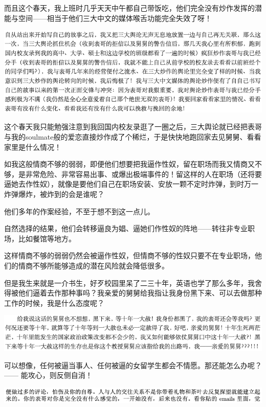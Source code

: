 \documentclass[9pt, b5paper]{article}
\begin{document}
而且这个春天，我上班时几乎天天中午都自己带饭吃，他们完全没有炒作发挥的潜能与空间——相当于他们三大中文的媒体喉舌功能完全失效了呀！

\begin{center}
\includegraphics[width=.9\linewidth]{./pic/backups_plans_20210417_220122.png}
\end{center}

这个春天我只能勉强注意到我回国内校友录逛了一圈之后，三大舆论就已经把表哥与我的soulmate般的爱恋直接炒作成了个稀烂，于是快快地跑回家去见舅舅、看看家里是什么情况！

如我这般情商不够的弱弱，即便他们想要把我逼作性奴，留在职场而我又情商又不够，是非常危险、非常容易出事、或爆出极端事件的！留这样的人在职场（还将要逼她去作性奴），就像是要他们自己在职场安装、安放一颗不定时炸弹，到时万一炸弹爆炸，被炸到的会是谁呢？

他们多年的作案经验，不至于想不到这一点儿。 

自然选择的结果，他们会转移逼良为娼、逼她们作性奴的阵地——转往非专业职场，比如餐馆等地方。 

这样情商不够的弱弱仍然会被逼作性奴，但情商不够的性奴只要不在专业职场，他们的情商不够所能够造成的潜在风险就会降低很多。 

但是我生来就是一介书生，好歹校园里呆了二三十年，英语也学了那么多年，我舍得被他们逼着去作那种事吗？我亲爱的舅舅给我指让我身份黑下来、可以去做那种工作的时候，我是什么态度呢？

\begin{center}
\includegraphics[width=.9\linewidth]{./pic/backups_plans_20210417_221406.png}
\end{center}

可以想像，任何被逼当事人、任何被逼的女留学生都会不情愿。那还能怎么办呢？ —— 能攻心，则反侧自消！

\begin{center}
\includegraphics[width=.9\linewidth]{./pic/backups_plans_20210417_222258.png}
\end{center}
\end{document}
